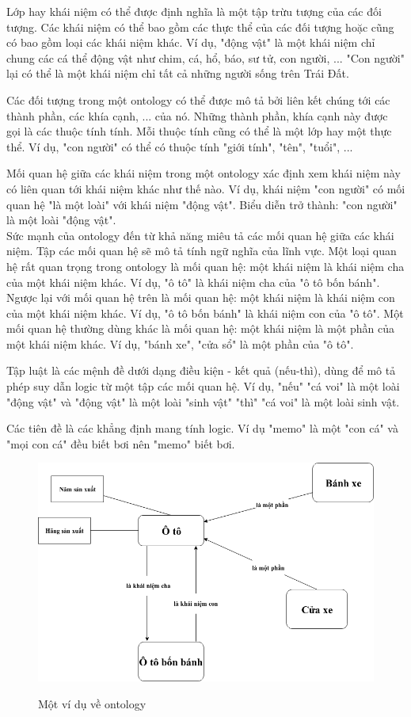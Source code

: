 Lớp hay khái niệm có thể được định nghĩa là một tập trừu tượng của các đối tượng. Các khái niệm có thể bao gồm các thực thể của các đối tượng hoặc cũng có bao gồm loại các khái niệm khác. Ví dụ, "động vật" là một khái niệm chỉ chung các cá thể động vật như chim, cá, hổ, báo, sư tử, con người, ... "Con người" lại có thể là một khái niệm chỉ tất cả những người sống trên Trái Đất. 

Các đối tượng trong một ontology có thể được mô tả bởi liên kết chúng tới các thành phần, các khía cạnh, ... của nó. Những thành phần, khía cạnh này được gọi là các thuộc tính tính. Mỗi thuộc tính cũng có thể là một lớp hay một thực thể. Ví dụ, "con người" có thể có thuộc tính "giới tính", "tên", "tuổi", ...
 
Mối quan hệ giữa các khái niệm trong một ontology xác định xem khái niệm này có liên quan tới khái niệm khác như thế nào. Ví dụ, khái niệm "con người" có mối quan hệ "là một loài" với khái niệm "động vật". Biểu diễn trở thành: "con người" là một loài "động vật". \\
Sức mạnh của ontology đến từ khả năng miêu tả các mối quan hệ giữa các khái niệm. Tập các mối quan hệ sẽ mô tả tính ngữ nghĩa của lĩnh vực. Một loại quan hệ rất quan trọng trong ontology là mối quan hệ: một khái niệm là khái niệm cha của một khái niệm khác. Ví dụ, "ô tô" là khái niệm cha của "ô tô bốn bánh". Ngược lại với mối quan hệ trên là mối quan hệ: một khái niệm là khái niệm con của một khái niệm khác. Ví dụ, "ô tô bốn bánh" là khái niệm con của "ô tô". Một mối quan hệ thường dùng khác là mối quan hệ: một khái niệm là một phần của một khái niệm khác. Ví dụ, "bánh xe", "cửa sổ" là một phần của "ô tô". 

Tập luật  là các mệnh đề dưới dạng điều kiện - kết quả (nếu-thì), dùng để mô tả phép suy dẫn logic từ một tập các mối quan hệ. Ví dụ, "nếu" "cá voi" là một loài "động vật"  và "động vật" là một loài "sinh vật" "thì" "cá voi" là một loài sinh vật.

Các tiên đề là các khẳng định mang tính logic. Ví dụ "memo" là một "con cá" và "mọi con cá" đều biết bơi nên "memo" biết bơi. 

\clearpage
\begin{figure}
	\center
	\includegraphics[scale=0.6]{image/otology_example}
	\label{fig:ontology}
	\caption{Một ví dụ về ontology}
\end{figure}


